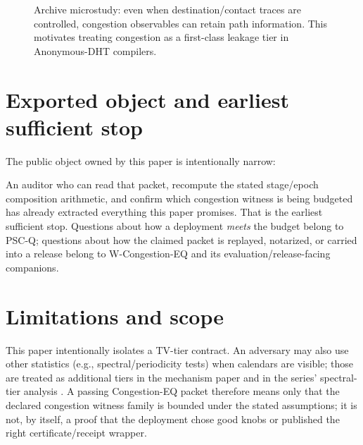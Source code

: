 \documentclass[11pt]{article}
\theoremstyle{definition}
\theoremstyle{remark}
\begin{document}
\begin{figure}[t]
\centering
{}
\caption{Archive microstudy: even when destination/contact traces are controlled, congestion observables can retain path information.
This motivates treating congestion as a first-class leakage tier in Anonymous-DHT compilers.}
\label{fig:dht}
\end{figure}

\section{Exported object and earliest sufficient stop}
The public object owned by this paper is intentionally narrow:
\begin{center}
\end{center}
An auditor who can read that packet, recompute the stated stage/epoch composition arithmetic, and confirm which congestion witness is being budgeted has already extracted everything this paper promises.
That is the earliest sufficient stop.
Questions about how a deployment \emph{meets} the budget belong to PSC-Q; questions about how the claimed packet is replayed, notarized, or carried into a release belong to W-Congestion-EQ and its evaluation/release-facing companions.\cite{series:pscq,series:wcongeq}

\section{Limitations and scope}
This paper intentionally isolates a TV-tier contract.
An adversary may also use other statistics (e.g., spectral/periodicity tests) when calendars are visible; those are treated as additional tiers in the mechanism paper and in the series' spectral-tier analysis \cite{series:spectral}.
A passing Congestion-EQ packet therefore means only that the declared congestion witness family is bounded under the stated assumptions; it is not, by itself, a proof that the deployment chose good knobs or published the right certificate/receipt wrapper.\cite{series:pscq,series:wcongeq}
\end{document}
